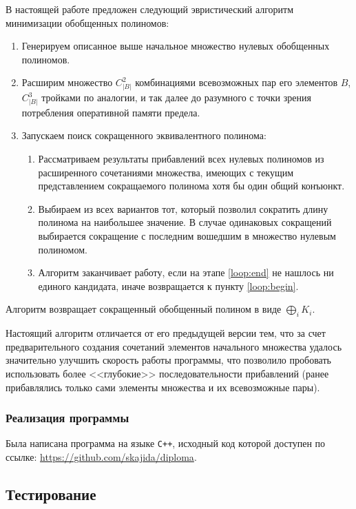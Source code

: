 \documentclass[a4paper,12pt,titlepage]{article}
\begin{document}
В настоящей работе предложен следующий эвристический алгоритм минимизации обобщенных полиномов:
\begin{enumerate}
    \item Генерируем описанное выше начальное множество нулевых обобщенных полиномов.
    \item Расширим множество $ C_{\left| B \right|}^2 $ комбинациями всевозможных пар его элементов $ B $, $ C_{\left| B \right|}^3 $ тройками по аналогии, и так далее до разумного с точки зрения потребления оперативной памяти предела.
    \item Запускаем поиск сокращенного эквивалентного полинома:
    \begin{enumerate}
        \item \label{loop:begin} Рассматриваем результаты прибавлений всех нулевых полиномов из расширенного сочетаниями множества, имеющих с текущим представлением сокращаемого полинома хотя бы один общий конъюнкт.
        \item \label{loop:end} Выбираем из всех вариантов тот, который позволил сократить длину полинома на наибольшее значение. В случае одинаковых сокращений выбирается сокращение с последним вошедшим в множество нулевым полиномом.
        \item Алгоритм заканчивает работу, если на этапе \ref{loop:end} не нашлось ни единого кандидата, иначе возвращается к пункту \ref{loop:begin}.
    \end{enumerate}
\end{enumerate}

Алгоритм возвращает сокращенный обобщенный полином в виде $ \bigoplus\limits_i K_i $.

Настоящий алгоритм отличается от его предыдущей версии тем, что за счет предварительного создания сочетаний элементов начального множества удалось значительно улучшить скорость работы программы, что позволило пробовать использовать более <<глубокие>> последовательности прибавлений (ранее прибавлялись только сами элементы множества и их всевозможные пары).

\subsubsection{Реализация программы}

Была написана программа на языке \texttt{C++}, исходный код которой доступен по ссылке: \url{https://github.com/skajida/diploma}.

\subsection{Тестирование}
\end{document}
